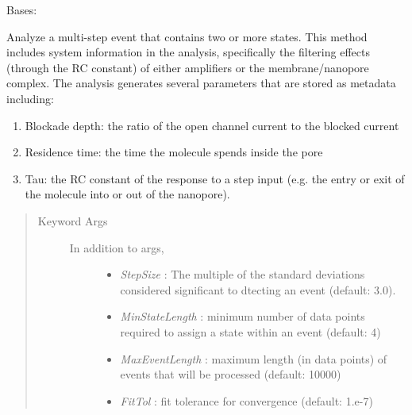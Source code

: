 \documentclass[letterpaper,10pt,english]{sphinxmanual}
\begin{document}
\begin{fulllineitems}
\label{api-doc/mosaic.processing:mosaic.adept.adept}
Bases: {\hyperref[api\string-doc/mosaic.meta:mosaic.metaEventProcessor.metaEventProcessor]{\emph{}}}

Analyze a multi-step event that contains two or more states. This method includes system 
information in the analysis, specifically the filtering effects (through the RC constant)
of either amplifiers or the membrane/nanopore complex. The analysis generates several 
parameters that are stored as metadata including:
\begin{enumerate}
\item {} 
Blockade depth: the ratio of the open channel current to the blocked current

\item {} 
Residence time: the time the molecule spends inside the pore

\item {} 
Tau: the RC constant  of the response to a step input (e.g. the entry or exit of the molecule into or out of the nanopore).

\end{enumerate}
\begin{quote}\begin{description}
\item[{Keyword Args}] \leavevmode\begin{description}
\item[{In addition to {\hyperref[api\string-doc/mosaic.meta:mosaic.metaEventProcessor.metaEventProcessor]{\emph{}}} args,}] \leavevmode\begin{itemize}
\item {} 
\emph{StepSize} :                  The multiple of the standard deviations considered significant to dtecting an event (default: 3.0).

\item {} 
\emph{MinStateLength} :    minimum number of data points required to assign a state within an event (default: 4)

\item {} 
\emph{MaxEventLength} :    maximum length (in data points) of events that will be processed (default: 10000)

\item {} 
\emph{FitTol} :                    fit tolerance for convergence (default: 1.e-7)


\end{itemize}
\end{description}
\end{description}
\end{quote}
\end{fulllineitems}
\end{document}
